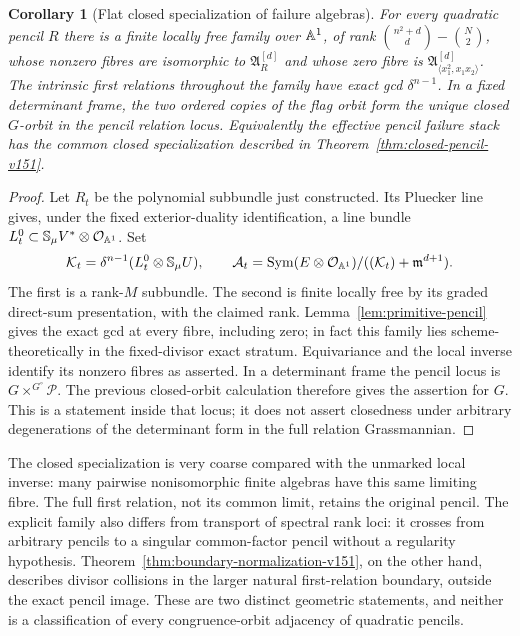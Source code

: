 \documentclass[11pt,reqno]{amsart}
\numberwithin{equation}{section}
\newtheorem{corollary}[theorem]{Corollary}
\theoremstyle{definition}\newtheorem{definition}[theorem]{Definition}
\theoremstyle{remark}\newtheorem{remark}[theorem]{Remark}
\newcommand{\OO}{\mathcal O}\newcommand{\II}{\mathcal I}
\DeclareMathOperator{\Sym}{Sym}\DeclareMathOperator{\Gr}{Gr}
\begin{document}
\begin{corollary}[Flat closed specialization of failure algebras]
\label{cor:closed-failure-v151}
For every quadratic pencil \(R\) there is a finite locally free
family over \(\mathbb A^1\), of rank
\(\binom{n^2+d}{d}-\binom N2\), whose nonzero fibres are isomorphic
to \(\mathfrak A_R^{[d]}\) and whose zero fibre is
\(\mathfrak A_{\langle x_1^2,x_1x_2\rangle}^{[d]}\).
The intrinsic first relations throughout the family have exact gcd
\(\delta^{n-1}\).  In a fixed determinant frame, the two ordered
copies of the flag orbit form the unique closed \(G\)-orbit in the
pencil relation locus.  Equivalently the effective pencil failure
stack has the common closed specialization described in
Theorem~\ref{thm:closed-pencil-v151}.
\end{corollary}
\begin{proof}
Let \(R_t\) be the polynomial subbundle just constructed.  Its
Pluecker line gives, under the fixed exterior-duality identification,
a line bundle \(L_t^0\subset\mathbb S_\mu V^*\otimes\OO_{\A^1}\).
Set
\[
 \mathcal K_t=\delta^{n-1}(L_t^0\otimes\mathbb S_\mu U),\qquad
 \mathcal A_t=\Sym(E\otimes\OO_{\A^1})/
                       ((\mathcal K_t)+\mathfrak m^{d+1}).
\]
The first is a rank-\(M\) subbundle.  The second is finite locally
free by its graded direct-sum presentation, with the claimed rank.
Lemma~\ref{lem:primitive-pencil} gives the exact gcd at every fibre,
including zero; in fact this family lies scheme-theoretically in the
fixed-divisor exact stratum.  Equivariance and the local inverse
identify its nonzero fibres as asserted.  In a determinant frame the
pencil locus is \(G\times^{G^\circ}\mathscr P\).  The previous
closed-orbit calculation therefore gives the assertion for \(G\).
This is a statement inside that locus; it does not assert closedness
under arbitrary degenerations of the determinant form in the full
relation Grassmannian.
\end{proof}

The closed specialization is very coarse compared with the unmarked
local inverse: many pairwise nonisomorphic finite algebras have this
same limiting fibre.  The full first relation, not its common limit,
retains the original pencil.  The explicit family also differs from
transport of spectral rank loci: it crosses from arbitrary pencils to
a singular common-factor pencil without a regularity hypothesis.
Theorem~\ref{thm:boundary-normalization-v151}, on the other hand,
describes divisor collisions in the larger natural first-relation
boundary, outside the exact pencil image.  These are two distinct
geometric statements, and neither is a classification of every
congruence-orbit adjacency of quadratic pencils.
\end{document}

